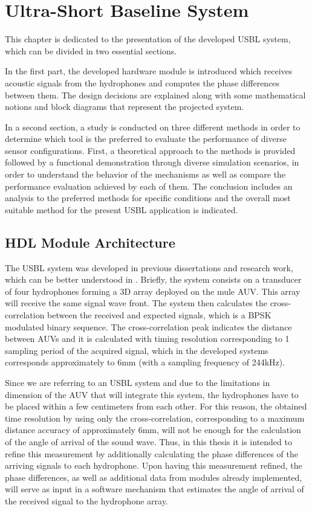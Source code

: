 \chapter{Ultra-Short Baseline System} \label{chap:proposed_sys}

This chapter is dedicated to the presentation of the developed USBL system, which can be divided in two essential sections. 

In the first part, the developed hardware module is introduced which receives acoustic signals from the hydrophones and computes the phase differences between them. The design decisions are explained along with some mathematical notions and block diagrams that represent the projected system. 

In a second section, a study is conducted on three different methods in order to determine which tool is the preferred to evaluate the performance of diverse sensor configurations. First, a theoretical approach to the methods is provided followed by a functional demonstration through diverse simulation scenarios, in order to understand the behavior of the mechanisms as well as compare the performance evaluation achieved by each of them. The conclusion includes an analysis to the preferred methods for specific conditions and the overall most suitable method for the present USBL application is indicated.
 
\section{HDL Module Architecture} \label{subchap:HDL module}

The USBL system was developed in previous dissertations and research work, which can be better understood in \cite{afonso-thesis}. Briefly, the system consists on a transducer of four hydrophones forming a 3D array deployed on the mule AUV. This array will receive the same signal wave front. The system then calculates the cross-correlation between the received and expected signals, which is a BPSK modulated binary sequence. The cross-correlation peak indicates the distance between AUVs and it is calculated with timing resolution corresponding to 1 sampling period of the acquired signal, which in the developed systems corresponds approximately to 6mm (with a sampling frequency of 244kHz).

Since we are referring to an USBL system and due to the limitations in dimension of the AUV that will integrate this system, the hydrophones have to be placed within a few centimeters from each other. For this reason, the obtained time resolution by using only the cross-correlation, corresponding to a maximum distance accuracy of approximately 6mm, will not be enough for the calculation of the angle of arrival of the sound wave. Thus, in this thesis it is intended to refine this measurement by additionally calculating the phase differences of the arriving signals to each hydrophone. Upon having this measurement refined, the phase differences, as well as additional data from modules already implemented, will serve as input in a software mechanism that estimates the angle of arrival of the received signal to the hydrophone array.

